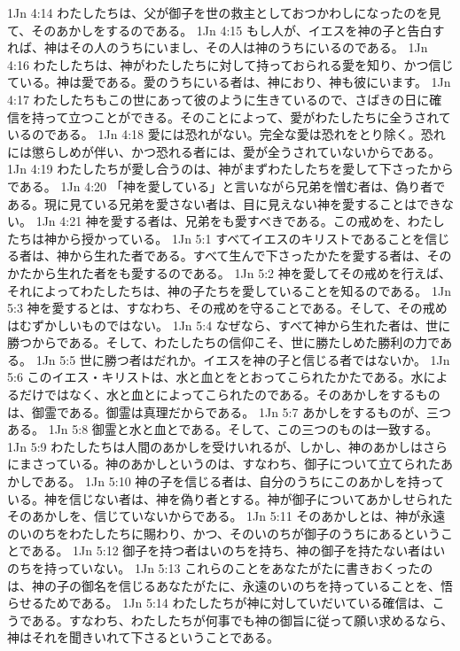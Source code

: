 1Jn 4:14  わたしたちは、父が御子を世の救主としておつかわしになったのを見て、そのあかしをするのである。
1Jn 4:15  もし人が、イエスを神の子と告白すれば、神はその人のうちにいまし、その人は神のうちにいるのである。
1Jn 4:16  わたしたちは、神がわたしたちに対して持っておられる愛を知り、かつ信じている。神は愛である。愛のうちにいる者は、神におり、神も彼にいます。
1Jn 4:17  わたしたちもこの世にあって彼のように生きているので、さばきの日に確信を持って立つことができる。そのことによって、愛がわたしたちに全うされているのである。
1Jn 4:18  愛には恐れがない。完全な愛は恐れをとり除く。恐れには懲らしめが伴い、かつ恐れる者には、愛が全うされていないからである。
1Jn 4:19  わたしたちが愛し合うのは、神がまずわたしたちを愛して下さったからである。
1Jn 4:20  「神を愛している」と言いながら兄弟を憎む者は、偽り者である。現に見ている兄弟を愛さない者は、目に見えない神を愛することはできない。
1Jn 4:21  神を愛する者は、兄弟をも愛すべきである。この戒めを、わたしたちは神から授かっている。
1Jn 5:1  すべてイエスのキリストであることを信じる者は、神から生れた者である。すべて生んで下さったかたを愛する者は、そのかたから生れた者をも愛するのである。
1Jn 5:2  神を愛してその戒めを行えば、それによってわたしたちは、神の子たちを愛していることを知るのである。
1Jn 5:3  神を愛するとは、すなわち、その戒めを守ることである。そして、その戒めはむずかしいものではない。
1Jn 5:4  なぜなら、すべて神から生れた者は、世に勝つからである。そして、わたしたちの信仰こそ、世に勝たしめた勝利の力である。
1Jn 5:5  世に勝つ者はだれか。イエスを神の子と信じる者ではないか。
1Jn 5:6  このイエス・キリストは、水と血とをとおってこられたかたである。水によるだけではなく、水と血とによってこられたのである。そのあかしをするものは、御霊である。御霊は真理だからである。
1Jn 5:7  あかしをするものが、三つある。
1Jn 5:8  御霊と水と血とである。そして、この三つのものは一致する。
1Jn 5:9  わたしたちは人間のあかしを受けいれるが、しかし、神のあかしはさらにまさっている。神のあかしというのは、すなわち、御子について立てられたあかしである。
1Jn 5:10  神の子を信じる者は、自分のうちにこのあかしを持っている。神を信じない者は、神を偽り者とする。神が御子についてあかしせられたそのあかしを、信じていないからである。
1Jn 5:11  そのあかしとは、神が永遠のいのちをわたしたちに賜わり、かつ、そのいのちが御子のうちにあるということである。
1Jn 5:12  御子を持つ者はいのちを持ち、神の御子を持たない者はいのちを持っていない。
1Jn 5:13  これらのことをあなたがたに書きおくったのは、神の子の御名を信じるあなたがたに、永遠のいのちを持っていることを、悟らせるためである。
1Jn 5:14  わたしたちが神に対していだいている確信は、こうである。すなわち、わたしたちが何事でも神の御旨に従って願い求めるなら、神はそれを聞きいれて下さるということである。
